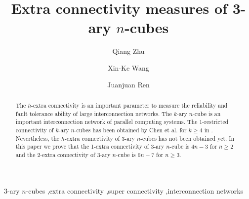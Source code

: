 \documentclass[preprint,number,12pt]{elsarticle}
\begin{document}
\newtheorem{thm}{Theorem}
\newtheorem{lem}[thm]{Lemma}
\newtheorem{cor}{Corollary }
\begin{frontmatter}





\title{Extra connectivity measures of 3-ary $n$-cubes}


\author[xidian]{Qiang Zhu}
\author[xidian]{Xin-Ke Wang}
\author[lgd]{Juanjuan Ren}



\address[xidian]{Department of Mathematics, Xidian University, Xi'an, Shanxi 710071, China}
\address[lgd]{School of Management Science, Xian University of Technology, Xi'an Shanxi 710023, China}



\begin{abstract}
The $h$-extra connectivity is an important parameter to measure the reliability and fault tolerance ability of large interconnection networks. The $k$-ary $n$-cube is an important interconnection network of parallel computing systems. The $1$-restricted connectivity of $k$-ary $n$-cubes has been obtained by Chen et al. for $k \geq 4$ in \cite{Chen2007-p1848-1855}. Nevertheless, the $h$-extra connectivity of 3-ary $n$-cubes has not been obtained yet. In this paper we prove that  the 1-extra connectivity  of 3-ary $n$-cube is $4n-3$ for $n\ge 2$ and the 2-extra connectivity  of 3-ary $n$-cube is $6n-7$ for $n\ge 3$.
\end{abstract}

\begin{keyword}
$3$-ary $n$-cubes \sep extra connectivity \sep super connectivity \sep interconnection networks




\end{keyword}

\end{frontmatter}
\end{document}

